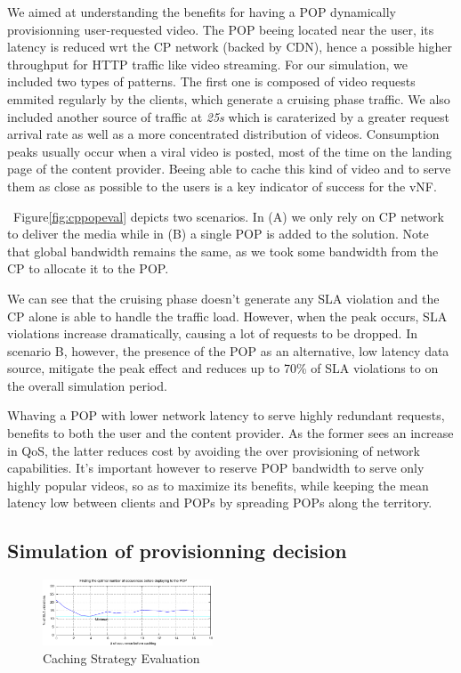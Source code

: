 We aimed at understanding the benefits for having a POP dynamically provisionning user-requested video. 
The POP beeing located near the user, its latency is reduced wrt the CP network (backed by CDN), hence a possible higher throughput for HTTP traffic like video streaming.
For our simulation, we included two types of patterns. The first one is composed of video requests emmited regularly by the clients, which generate a cruising phase traffic. We also included another source of traffic at \textit{25s} which is caraterized by a greater request arrival rate as well as a more concentrated distribution of videos. Consumption peaks usually occur when a viral video is posted, most of the time on the landing page of the content provider. Beeing able to cache this kind of video and to serve them as close as possible to the users is a key indicator of success for the vNF.

~Figure\ref{fig:cppopeval} depicts two scenarios. In (A) we only rely on CP network to deliver the media while in (B) a single POP is added to the solution. Note that global bandwidth remains the same, as we took some bandwidth from the CP to allocate it to the POP.

We can see that the cruising phase doesn't generate any SLA violation and the CP alone is able to handle the traffic load. However, when the peak occurs, SLA violations increase dramatically, causing a lot of requests to be dropped. In scenario B, however, the presence of the POP as an alternative, low latency data source, mitigate the peak effect and reduces up to 70\% of SLA violations to on the overall simulation period.

Whaving a POP with lower network latency to serve highly redundant requests, benefits to both the user and the content provider. As the former sees an increase in QoS, the latter reduces cost by avoiding the over provisioning of network capabilities. It's important however to reserve POP bandwidth to serve only highly popular videos, so as to maximize its benefits, while keeping the mean latency low between clients and POPs by spreading POPs along the territory.




\subsection{Simulation of provisionning decision} \label{provisionningdecisions}

\begin{figure}
	
 \begin{center}
    \includegraphics[width=0.45\textwidth]{fig/cachingStrat_evaluation.pdf}
  \end{center}
  \caption{ Caching Strategy Evaluation
    \label{fig:cachingstrateval}
  }
\end{figure}	

